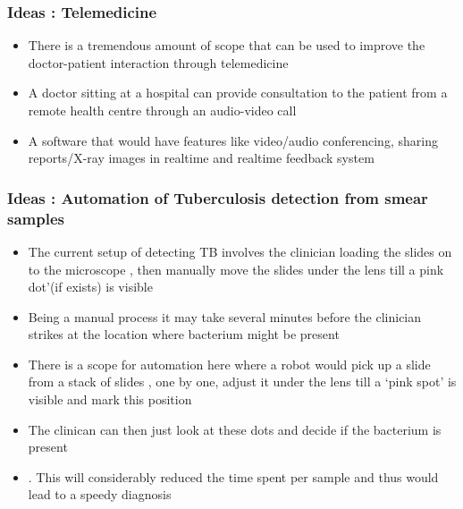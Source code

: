 \documentclass{beamer}
\begin{document}
\begin{frame}
\frametitle{Ideas : Telemedicine}
    \begin{itemize}[<only@+-+(4)>]
        \item  There is a tremendous amount of scope that can be used to improve the doctor-patient interaction through telemedicine
        \item  A doctor sitting at a hospital can provide consultation to the patient from a remote health centre through an audio-video call
        \item  A software that would have features like video/audio conferencing, sharing reports/X-ray images in realtime and realtime feedback system 
    \end{itemize}
\end{frame}



\begin{frame}
\frametitle{Ideas : Automation of Tuberculosis detection from smear samples}
    \begin{itemize}[<only@+-+(4)>]
        \item  The current setup of detecting TB involves the clinician loading the slides on to the microscope , then manually move the slides under the lens till a 
pink dot’(if exists) is visible
        \item   Being a manual process it may take several minutes before the clinician strikes at the location where bacterium might be present
        \item  There is a scope for automation here where a robot would pick up a slide from a stack of slides , one by one, adjust it under the lens till a ‘pink spot’ is visible and mark this position 
        \item The clinican can then just look at these dots and decide if the bacterium is present
        \item . This will considerably reduced the time spent per sample and thus would lead to a speedy diagnosis
    \end{itemize}
\end{frame}
\end{document}
